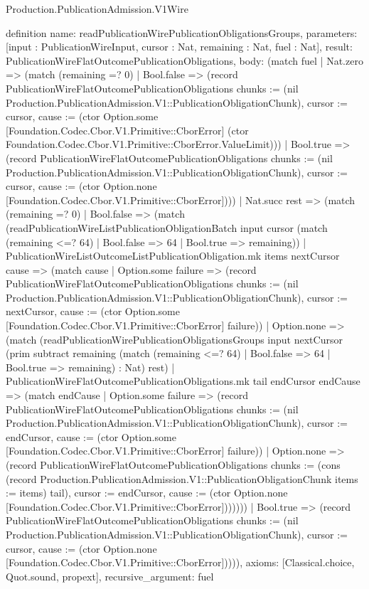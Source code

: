 \begin{lexlean}{Production.PublicationAdmission.V1Wire}
\begin{semanticmodule}
definition{
  name: readPublicationWirePublicationObligationsGroups,
  parameters: [input : PublicationWireInput, cursor : Nat, remaining : Nat, fuel : Nat],
  result: PublicationWireFlatOutcomePublicationObligations,
  body: (match fuel
    | Nat.zero => (match (remaining =? 0)
      | Bool.false => (record PublicationWireFlatOutcomePublicationObligations {chunks := (nil Production.PublicationAdmission.V1::PublicationObligationChunk), cursor := cursor, cause := (ctor Option.some [Foundation.Codec.Cbor.V1.Primitive::CborError] (ctor Foundation.Codec.Cbor.V1.Primitive::CborError.ValueLimit))})
      | Bool.true => (record PublicationWireFlatOutcomePublicationObligations {chunks := (nil Production.PublicationAdmission.V1::PublicationObligationChunk), cursor := cursor, cause := (ctor Option.none [Foundation.Codec.Cbor.V1.Primitive::CborError])}))
    | Nat.succ rest => (match (remaining =? 0)
      | Bool.false => (match (readPublicationWireListPublicationObligationBatch input cursor (match (remaining <=? 64)
          | Bool.false => 64
          | Bool.true => remaining))
        | PublicationWireListOutcomeListPublicationObligation.mk items nextCursor cause => (match cause
          | Option.some failure => (record PublicationWireFlatOutcomePublicationObligations {chunks := (nil Production.PublicationAdmission.V1::PublicationObligationChunk), cursor := nextCursor, cause := (ctor Option.some [Foundation.Codec.Cbor.V1.Primitive::CborError] failure)})
          | Option.none => (match (readPublicationWirePublicationObligationsGroups input nextCursor (prim subtract remaining (match (remaining <=? 64)
              | Bool.false => 64
              | Bool.true => remaining) : Nat) rest)
            | PublicationWireFlatOutcomePublicationObligations.mk tail endCursor endCause => (match endCause
              | Option.some failure => (record PublicationWireFlatOutcomePublicationObligations {chunks := (nil Production.PublicationAdmission.V1::PublicationObligationChunk), cursor := endCursor, cause := (ctor Option.some [Foundation.Codec.Cbor.V1.Primitive::CborError] failure)})
              | Option.none => (record PublicationWireFlatOutcomePublicationObligations {chunks := (cons (record Production.PublicationAdmission.V1::PublicationObligationChunk {items := items}) tail), cursor := endCursor, cause := (ctor Option.none [Foundation.Codec.Cbor.V1.Primitive::CborError])})))))
      | Bool.true => (record PublicationWireFlatOutcomePublicationObligations {chunks := (nil Production.PublicationAdmission.V1::PublicationObligationChunk), cursor := cursor, cause := (ctor Option.none [Foundation.Codec.Cbor.V1.Primitive::CborError])}))),
  axioms: [Classical.choice, Quot.sound, propext],
  recursive_argument: fuel
}


\end{semanticmodule}
\end{lexlean}
